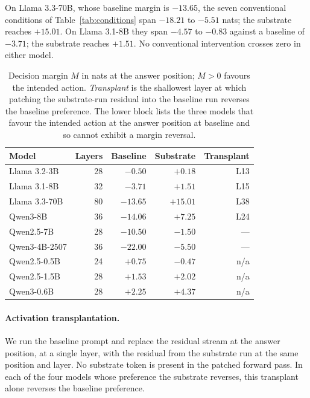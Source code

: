 On Llama 3.3-70B, whose baseline margin is $-13.65$, the seven conventional
conditions of Table~\ref{tab:conditions} span $-18.21$ to $-5.51$ nats; the
substrate reaches $+15.01$. On Llama 3.1-8B they span $-4.57$ to $-0.83$ against a
baseline of $-3.71$; the substrate reaches $+1.51$. No conventional intervention
crosses zero in either model.

\begin{table}[t]
\centering
\caption{Decision margin $M$ in nats at the answer position; $M>0$ favours the
intended action. \emph{Transplant} is the shallowest layer at which patching the
substrate-run residual into the baseline run reverses the baseline preference. The
lower block lists the three models that favour the intended action at the answer
position at baseline and so cannot exhibit a margin reversal.}
\label{tab:margins}
\begin{tabular}{lrrrr}
\toprule
Model & Layers & Baseline & Substrate & Transplant \\
\midrule
Llama 3.2-3B   & 28 & $-0.50$  & $+0.18$  & L13 \\
Llama 3.1-8B   & 32 & $-3.71$  & $+1.51$  & L15 \\
Llama 3.3-70B  & 80 & $-13.65$ & $+15.01$ & L38 \\
Qwen3-8B       & 36 & $-14.06$ & $+7.25$  & L24 \\
Qwen2.5-7B     & 28 & $-10.50$ & $-1.50$  & --- \\
Qwen3-4B-2507  & 36 & $-22.00$ & $-5.50$  & --- \\
\midrule
Qwen2.5-0.5B   & 24 & $+0.75$  & $-0.47$  & n/a \\
Qwen2.5-1.5B   & 28 & $+1.53$  & $+2.02$  & n/a \\
Qwen3-0.6B     & 28 & $+2.25$  & $+4.37$  & n/a \\
\bottomrule
\end{tabular}
\end{table}

\paragraph{Activation transplantation.}
We run the baseline prompt and replace the residual stream at the answer position,
at a single layer, with the residual from the substrate run at the same position and
layer. No substrate token is present in the patched forward pass. In each of the
four models whose preference the substrate reverses, this transplant alone reverses
the baseline preference.

